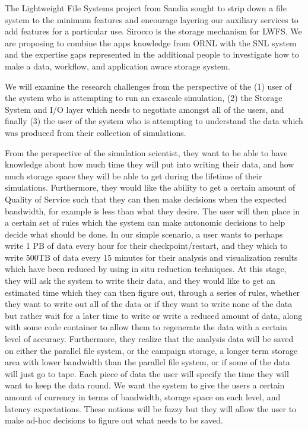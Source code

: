 The Lightweight File Systems project from Sandia sought to strip down a file
system to the minimum features and encourage layering our auxiliary services to
add features for a particular use. Sirocco is the storage mechanism for LWFS.
We are proposing to combine the apps knowledge from ORNL with the SNL system
and the expertise gaps represented in the additional people to investigate how
to make a data, workflow, and application aware storage system.

We will examine the research challenges from the perspective of the (1) user of the system who is attempting to run an exascale simulation,
(2) the Storage System and I/O layer which needs to negotiate amongst all of the users, and finally (3) the user of the system who is attempting to
understand the data which was produced from their collection of simulations.

From the perspective of the simulation scientist, they want to be able to have knowledge about how much time they will 
put into writing their data, and how much storage space they will be able to get during the lifetime of their simulations. Furthermore, they
would like the ability to get a certain amount of Quality of Service such that they can then make decisions when the expected bandwidth, for example
is less than what they desire. The user will then place in a certain set of rules which the system can make autonomic decisions to help decide what
should be done. In our simple scenario, a user wants to perhaps write 1 PB of data every hour for their checkpoint/restart, and they which to write 500TB of data
every 15 minutes for their analysis and visualization results which have been reduced by using in situ reduction techniques. At this stage, they will ask the system
to write their data, and they would like to get an estimated time which they can then figure out, through a series of rules, whether they want to write out all of the
data or if they want to write none of the data but rather wait for a later time to write or write a reduced amount of data, along with some code container to allow them 
to regenerate the data with a certain level of accuracy. Furthermore, they realize that the analysis data will be saved on either the parallel file system, or the campaign storage,
a longer term storage area with lower bandwidth than the parallel file system, or if some of the data will just go to tape. Each piece of data the user will specify the
time they will want to keep the data round. We want the system to give the users a certain amount of currency in terms of bandwidth, storage space on each level, and latency expectations.
These notions will be fuzzy but they will allow the user to make ad-hoc decisions to figure out what needs to be saved.

